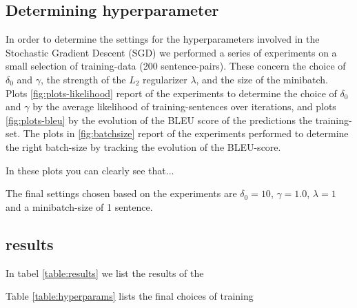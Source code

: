 \documentclass[11pt, a4paper]{article}
\begin{document}
\subsection{Determining hyperparameter}
In order to determine the settings for the hyperparameters involved in the Stochastic Gradient Descent (SGD) we performed a series of experiments on a small selection of training-data (200 sentence-pairs). These concern the choice of $\delta_0$ and $\gamma$, the strength of the $L_2$ regularizer $\lambda$, and the size of the minibatch. Plots \ref{fig:plots-likelihood} report of the experiments to determine the choice of $\delta_0$ and $\gamma$ by the average likelihood of training-sentences over iterations, and plots \ref{fig:plots-bleu} by the evolution of the BLEU score of the predictions the training-set. The plots in \ref{fig:batchsize} report of the experiments performed to determine the right batch-size by tracking the evolution of the BLEU-score. 

In these plots you can clearly see that...

The final settings chosen based on the experiments are $\delta_0=10$, $\gamma=1.0$, $\lambda=1$ and a minibatch-size of 1 sentence.

\subsection{results} %
\label{sub:results}

In tabel \ref{table:results} we list the results of the 


Table \ref{table:hyperparams} lists the final choices of training
\end{document}
